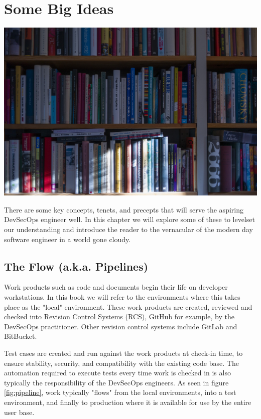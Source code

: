 \chapter{Some Big Ideas}

\includegraphics[scale=0.85]{../images/book-5104342_1920.jpg}

\justify
There are some key concepts, tenets, and precepts that will serve the aspiring DevSecOps engineer well. In this chapter we will explore some of these to levelset our understanding and introduce the reader to the vernacular of the modern day software engineer in a world gone cloudy.

\section{The Flow (a.k.a. Pipelines)}

\justify
Work products such as code and documents begin their life on developer workstations. In this book we will refer to the environments where this takes place as the "local" environment. These work products are created, reviewed and checked into Revision Control Systems (RCS), GitHub for example, by the DevSecOps practitioner. Other revision control systems include GitLab and BitBucket.

\justify
Test cases are created and run against the work products at check-in time, to ensure stability, security, and compatibility with the existing code base. The automation required to execute tests every time work is checked in is also typically the responsibility of the DevSecOps engineers. As seen in figure \ref{fig:pipeline}, work typically "flows" from the local environments, into a test environment, and finally to production where
it is available for use by the entire user base.

